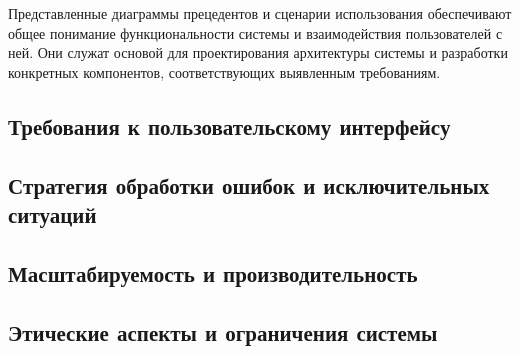 Представленные диаграммы прецедентов и сценарии использования обеспечивают общее понимание функциональности системы и взаимодействия пользователей с ней. Они служат основой для проектирования архитектуры системы и разработки конкретных компонентов, соответствующих выявленным требованиям.

\subsection{Требования к пользовательскому интерфейсу}

\subsection{Стратегия обработки ошибок и исключительных ситуаций}

\subsection{Масштабируемость и производительность}

\subsection{Этические аспекты и ограничения системы}